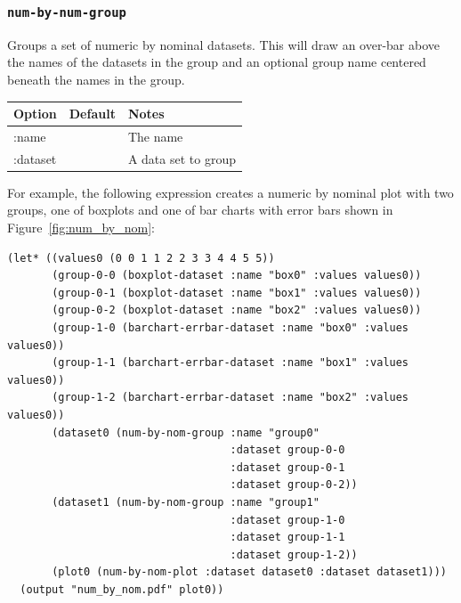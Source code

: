 \documentclass{article}
\begin{document}
\subsubsection{\tt num-by-num-group}

Groups a set of numeric by nominal datasets.  This will draw an
over-bar above the names of the datasets in the group and an optional
group name centered beneath the names in the group.

\begin{center}
\begin{tabular}{lll}
Option & Default & Notes \\
\hline
:name & & The name\\
:dataset & & A data set to group\\
\end{tabular}
\end{center}

For example, the following expression creates a numeric by nominal
plot with two groups, one of boxplots and one of bar charts with error
bars shown in Figure~\ref{fig:num_by_nom}:
\begin{verbatim}
(let* ((values0 (0 0 1 1 2 2 3 3 4 4 5 5))
       (group-0-0 (boxplot-dataset :name "box0" :values values0))
       (group-0-1 (boxplot-dataset :name "box1" :values values0))
       (group-0-2 (boxplot-dataset :name "box2" :values values0))
       (group-1-0 (barchart-errbar-dataset :name "box0" :values values0))
       (group-1-1 (barchart-errbar-dataset :name "box1" :values values0))
       (group-1-2 (barchart-errbar-dataset :name "box2" :values values0))
       (dataset0 (num-by-nom-group :name "group0"
                                   :dataset group-0-0
                                   :dataset group-0-1
                                   :dataset group-0-2))
       (dataset1 (num-by-nom-group :name "group1"
                                   :dataset group-1-0
                                   :dataset group-1-1
                                   :dataset group-1-2))
       (plot0 (num-by-nom-plot :dataset dataset0 :dataset dataset1)))
  (output "num_by_nom.pdf" plot0))
\end{verbatim}
\end{document}
